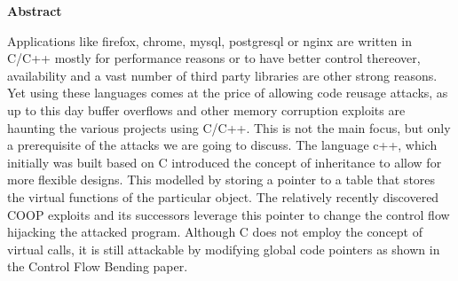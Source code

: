 

\clearemptydoublepage
{}
{}	

\vspace*{2cm}
\begin{center}
{\Large \bf Abstract}
\end{center}
\vspace{1cm}
Applications like firefox, chrome, mysql, postgresql or nginx are written in C/C++ mostly for performance reasons or to have better control thereover, availability and a vast number of third party libraries are other strong reasons. Yet using these languages comes at the price of allowing code reusage attacks, as up to this day buffer overflows and other memory corruption exploits are haunting the various projects using C/C++. This is not the main focus, but only a prerequisite of the attacks we are going to discuss. The language c++, which initially was built based on C introduced the concept of inheritance to allow for more flexible designs. This modelled by storing a pointer to a table that stores the virtual functions of the particular object. The relatively recently discovered COOP exploits and its successors leverage this pointer to change the control flow hijacking the attacked program. Although C does not employ the concept of virtual calls, it is still attackable by modifying global code pointers as shown in the Control Flow Bending paper.

